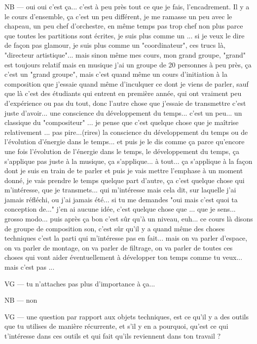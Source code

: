 NB — oui oui c'est ça... c'est à peu près tout ce que je fais, l'encadrement. Il y a le cours d'ensemble, ça c'est un peu différent, je me ramasse un peu avec le chapeau, un peu chef d'orchestre, en même temps pas trop chef non plus parce que toutes les partitions sont écrites, je suis plus comme un ... si je veux le dire de façon pas glamour, je suis plus comme un "coordinateur", ces trucs là, "directeur artistique"... mais sinon même mes cours, mon grand groupe, "grand" est toujours relatif mais en musique j'ai un groupe de 20 personnes à peu près, ça c'est un "grand groupe",  mais c'est quand même un cours d'initiation à la composition que j'essaie quand même d'inculquer ce dont je viens de parler, sauf que là c'est des étudiants qui entrent en  première année, qui ont vraiment peu d'expérience ou pas du tout, donc l'autre chose que j'essaie de transmettre c'est juste d'avoir... une conscience du développement du temps... c'est un peu... un classique du "compositeur" ... je pense que c'est quelque chose que je maîtrise relativement ... pas pire...(rires) la conscience du développement du temps ou de l'évolution d'énergie dans le temps... et puis je le dis comme ça parce qu'encore une fois l'évolution de l'énergie dans le temps, le développement du temps, ça s'applique pas juste à la musique, ça s'applique... à tout... ça s'applique à la façon dont je suis en train de te parler et puis je vais mettre l'emphase à un moment donné, je vais prendre le temps quelque part d'autre, ça c'est quelque chose qui m'intéresse, que je transmets... qui m'intéresse mais cela dit, sur laquelle j'ai jamais réfléchi, ou j'ai jamais été... si tu me demandes "oui  mais c'est quoi ta conception de..." j'en ai aucune idée, c'est quelque chose que ... que je sens... grosso modo... puis après ça bon c'est sûr qu'à un niveau, euh... ce cours là disons de groupe de composition son, c'est sûr qu'il y a quand même des choses techniques c'est la parti qui m'intéresse pas en fait... mais on va parler d'espace, on va parler de montage, on va parler de  filtrage, on va parler de toutes ces choses qui vont aider éventuellement à développer ton temps comme tu veux... mais c'est pas ...

VG — tu n'attaches pas plus d'importance à ça...

NB — non

VG — une question par rapport aux objets techniques, est ce qu'il y a des outils que tu utilises de manière récurrente, et s'il y en a pourquoi, qu'est ce qui t'intéresse dans ces outils et qui fait qu'ils reviennent dans ton travail ?

